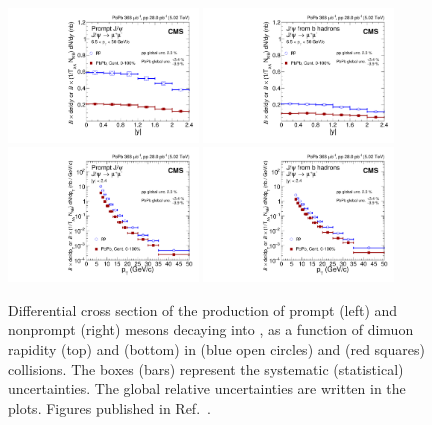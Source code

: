 \begin{figure}[htb!]
 \centering
  \includegraphics[width=0.45\textwidth]{Figures/Charmonia/Results/Prompt_JPsi_XSec/Figure_003-c.pdf}
  \includegraphics[width=0.45\textwidth]{Figures/Charmonia/Results/NonPrompt_JPsi_XSec/Figure_003-d.pdf}\\
  \includegraphics[width=0.45\textwidth]{Figures/Charmonia/Results/Prompt_JPsi_XSec/Figure_003-a.pdf}
  \includegraphics[width=0.45\textwidth]{Figures/Charmonia/Results/NonPrompt_JPsi_XSec/Figure_003-b.pdf}
  \caption{Differential cross section of the production of prompt (left) and nonprompt (right) \JPsi mesons decaying into \mumu, as a function of dimuon rapidity (top) and \pt (bottom) in \Runpp (blue open circles) and \RunPbPb (red squares) collisions. The boxes (bars) represent the systematic (statistical) uncertainties. The global relative uncertainties are written in the plots. Figures published in Ref.~\cite{CMS_JPsi_PbPb_5p02TeV}.}
 \label{fig:Jpsi_XSec}
\end{figure}

